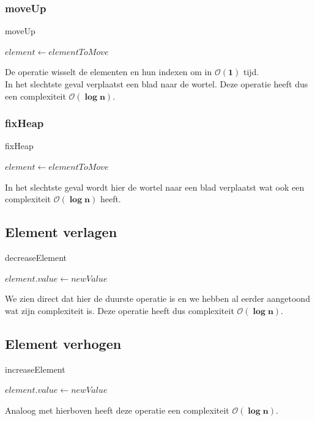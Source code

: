 \documentclass[a4paper,12pt]{report}
\newcommand{\bigO}[1]{$\bm{\mathcal{O}(#1)}$} %
\begin{document}
\subsubsection{moveUp}
\begin{algorithm}[H]
\caption{moveUp}
\SetAlgoLined	
\DontPrintSemicolon
$element \gets elementToMove$\;
\end{algorithm}
De  operatie wisselt de elementen en hun indexen om in \bigO{1} tijd. \\
In het slechtste geval verplaatst  een blad naar de wortel. Deze operatie heeft dus een complexiteit \bigO{\log n}.
\subsubsection{fixHeap}
\begin{algorithm}[H]
\caption{fixHeap}
\SetAlgoLined	
\DontPrintSemicolon
$element \gets elementToMove$\;
\end{algorithm}
In het slechtste geval wordt hier de wortel naar een blad verplaatst wat ook een complexiteit \bigO{\log n} heeft.
\subsection{Element verlagen}
\begin{algorithm}[H]
\caption{decreaseElement}
\SetAlgoLined	
\DontPrintSemicolon
$element.value \gets newValue$\;
\;	
\end{algorithm}
We zien direct dat  hier de duurste operatie is en we hebben al eerder aangetoond wat zijn complexiteit is. Deze operatie heeft dus complexiteit \bigO{\log n}.
\subsection{Element verhogen}
\begin{algorithm}[H]
\caption{increaseElement}
\SetAlgoLined	
\DontPrintSemicolon
$element.value \gets newValue$\;
\;		
\end{algorithm}
Analoog met hierboven heeft deze operatie een complexiteit \bigO{\log n}.
\end{document}
